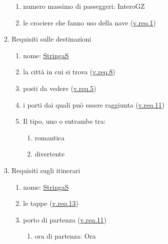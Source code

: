 \documentclass{article}
\begin{document}
\begin{enumerate}
\begin{enumerate}
        \item numero massimo di passeggeri: InteroGZ\label{sec:RequisitiNaveNumeroMassimoDiPasseggeri}
        \item le crociere che fanno uso della nave (\hyperref[sec:RequisitiCrociera]{\hyperref[sec:RequisitiCrociera]{v.req.1}})\label{sec:RequisitiNaveCrociere}
    \end{enumerate}
    \item Requisiti sulle destinazioni\label{sec:RequisitiDestinazione}
    \begin{enumerate}
        \item nome: \hyperref[sec:StringaS]{StringaS}\label{sec:RequisitiDestinazioneNome}
        \item la città in cui si trova (\hyperref[sec:RequisitiCittà]{v.req.8})\label{sec:RequisitiDestinazioneCittà}
        \item posti da vedere (\hyperref[sec:RequisitiPostoDaVedere]{v.req.5})\label{sec:RequisitiDestinazionePostiDaVedere}
        \item i porti dai quali può essere raggiunta (\hyperref[sec:RequisitiPorto]{v.req.11})\label{sec:RequisitiDestinazionePorti}
        \item Il tipo, uno o entrambe tra:\label{sec:RequisitiDestinazioneTipo}
        \begin{enumerate}
            \item romantica\label{sec:RequisitiDestinazioneTipoRomantica}
            \item divertente\label{sec:RequisitiDestinazioneTipoDivertente}
        \end{enumerate}
    \end{enumerate}
    \item Requisiti sugli itinerari\label{sec:RequisitiItinerario}
    \begin{enumerate}
        \item nome: \hyperref[sec:StringaS]{StringaS}\label{sec:RequisitiItinerarioNome}
        \item le tappe (\hyperref[sec:RequisitiTappa]{v.req.13})\label{sec:RequisitiItinerarioTappe}
        \item porto di partenza (\hyperref[sec:RequisitiPorto]{v.req.11})\label{sec:RequisitiItinerarioPortoDiPartenza}
        \begin{enumerate}
            \item ora di partenza: Ora\label{sec:RequisitiItinerarioPortoDiPartenzaOra}
        \end{enumerate}

\end{enumerate}
\end{enumerate}
\end{document}
